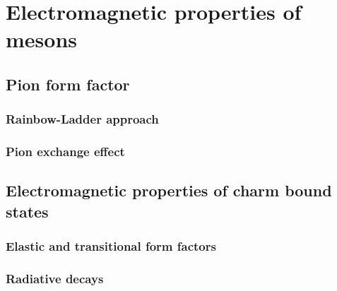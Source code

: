 \chapter{Electromagnetic properties of mesons}
\label{chap:EM_props}

\section{Pion form factor}
	\subsection{Rainbow-Ladder approach}
	\subsection{Pion exchange effect}
\section{Electromagnetic properties of charm bound states}
	\subsection{Elastic and transitional form factors}
	\subsection{Radiative decays}